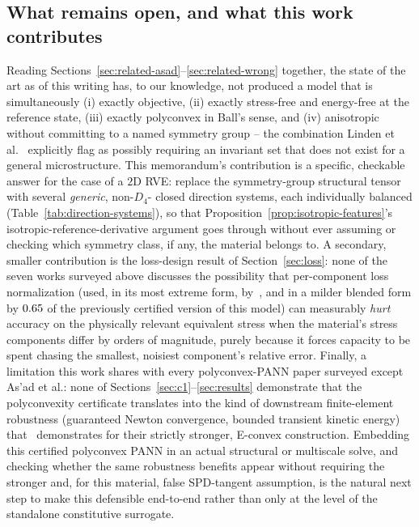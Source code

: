 \documentclass[10pt,a4paper]{article}
\begin{document}
\subsection{What remains open, and what this work contributes}
\label{sec:related-gap}
Reading Sections~\ref{sec:related-asad}--\ref{sec:related-wrong} together,
the state of the art as of this writing has, to our knowledge, not
produced a model that is simultaneously (i) exactly objective, (ii)
exactly stress-free and energy-free at the reference state, (iii) exactly
polyconvex in Ball's sense, and (iv) anisotropic without committing to a
named symmetry group -- the combination Linden et al.~\cite{Linden2023}
explicitly flag as possibly requiring an invariant set that does not exist
for a general microstructure.  This memorandum's contribution is a
specific, checkable answer for the case of a $2$D RVE: replace the
symmetry-group structural tensor with several \emph{generic}, non-$D_4$-
closed direction systems, each individually balanced
(Table~\ref{tab:direction-systems}), so that Proposition~\ref{prop:isotropic-features}'s
isotropic-reference-derivative argument goes through without ever
assuming or checking which symmetry class, if any, the material belongs
to.  A secondary, smaller contribution is the loss-design result of
Section~\ref{sec:loss}: none of the seven works surveyed above discusses
the possibility that per-component loss normalization (used, in its most
extreme form, by~\cite{Asad2022}, and in a milder blended form by
$0.65{}$ of the previously certified version of this
model) can measurably \emph{hurt} accuracy on the physically relevant
equivalent stress when the material's stress components differ by orders
of magnitude, purely because it forces capacity to be spent chasing the
smallest, noisiest component's relative error.  Finally, a limitation this
work shares with every polyconvex-PANN paper surveyed except
As'ad et al.: none of Sections~\ref{sec:c1}--\ref{sec:results} demonstrate
that the polyconvexity certificate translates into the kind of downstream
finite-element robustness (guaranteed Newton convergence, bounded
transient kinetic energy) that~\cite{Asad2022} demonstrates for their
strictly stronger, E-convex construction.  Embedding this certified
polyconvex PANN in an actual structural or multiscale solve, and checking
whether the same robustness benefits appear without requiring the
stronger and, for this material, false SPD-tangent assumption, is the
natural next step to make this defensible end-to-end rather than only at
the level of the standalone constitutive surrogate.
\end{document}
